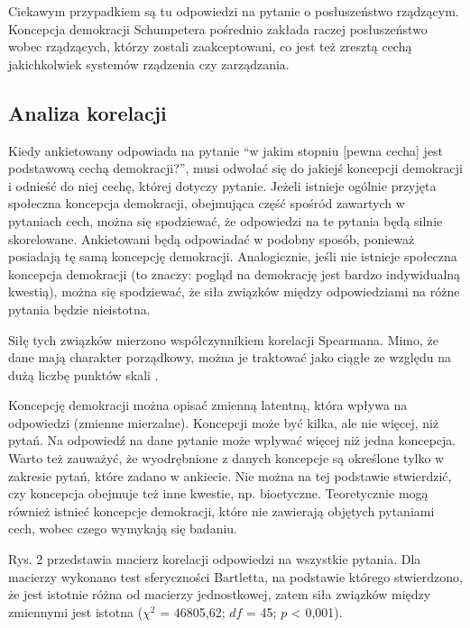 \documentclass[12pt]{article}
\begin{document}
Ciekawym przypadkiem są tu odpowiedzi na pytanie o posłuszeństwo rządzącym. Koncepcja demokracji Schumpetera pośrednio zakłada raczej posłuszeństwo wobec rządzących, którzy zostali zaakceptowani, co jest też zresztą cechą jakichkolwiek systemów rządzenia czy zarządzania.

\hypertarget{analiza-korelacji}{%
\subsection{Analiza korelacji}\label{analiza-korelacji}}

Kiedy ankietowany odpowiada na pytanie ``w jakim stopniu {[}pewna cecha{]} jest podstawową cechą demokracji?'', musi odwołać się do jakiejś koncepcji demokracji i odnieść do niej cechę, której dotyczy pytanie. Jeżeli istnieje ogólnie przyjęta społeczna koncepcja demokracji, obejmująca część spośród zawartych w pytaniach cech, można się spodziewać, że odpowiedzi na te pytania będą silnie skorelowane. Ankietowani będą odpowiadać w podobny sposób, ponieważ posiadają tę samą koncepcję demokracji. Analogicznie, jeśli nie istnieje społeczna koncepcja demokracji (to znaczy: pogląd na demokrację jest bardzo indywidualną kwestią), można się spodziewać, że siła związków między odpowiedziami na różne pytania będzie nieistotna.

Siłę tych związków mierzono współczynnikiem korelacji Spearmana. Mimo, że dane mają charakter porządkowy, można je traktować jako ciągłe ze względu na dużą liczbę punktów skali \citep{Revelle}.

Koncepcję demokracji można opisać zmienną latentną, która wpływa na odpowiedzi (zmienne mierzalne). Koncepcji może być kilka, ale nie więcej, niż pytań. Na odpowiedź na dane pytanie może wpływać więcej niż jedna koncepcja. Warto też zauważyć, że wyodrębnione z danych koncepcje są określone tylko w zakresie pytań, które zadano w ankiecie. Nie można na tej podstawie stwierdzić, czy koncepcja obejmuje też inne kwestie, np. bioetyczne. Teoretycznie mogą również istnieć koncepcje demokracji, które nie zawierają objętych pytaniami cech, wobec czego wymykają się badaniu.

Rys. 2 przedstawia macierz korelacji odpowiedzi na wszystkie pytania. Dla macierzy wykonano test sferyczności Bartletta, na podstawie którego stwierdzono, że jest istotnie różna od macierzy jednostkowej, zatem siła związków między zmiennymi jest istotna (\(\chi^2\) = 46805,62; \(df\) = 45; \(p\) \textless{} 0,001).
\end{document}
